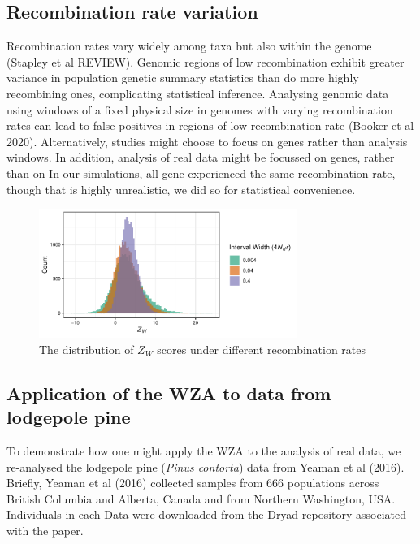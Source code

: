 \documentclass[11pt,twoside,lineno]{GSA_format}
\begin{document}
\subsection{Recombination rate variation}

Recombination rates vary widely among taxa but also within the genome (Stapley et al REVIEW). Genomic regions of low recombination exhibit greater variance in population genetic summary statistics than do more highly recombining ones, complicating statistical inference. Analysing genomic data using windows of a fixed physical size in genomes with varying recombination rates can lead to false positives in regions of low recombination rate (Booker et al 2020). Alternatively, studies might choose to focus on genes rather than analysis windows.
In addition, analysis of real data might be focussed on genes, rather than on 
In our simulations, all gene experienced the same recombination rate, though that is highly unrealistic, we did so for statistical convenience.

\begin{figure}[H]
  \includegraphics[width=0.75\textwidth,height=0.5\textheight,keepaspectratio]{Plots/recombinationRateHistogram.pdf} 
  \caption{The distribution of $Z_W$ scores under different recombination rates }

  \label{fig:WZA_Recombination}
\end{figure}

 
\subsection{Application of the WZA to data from lodgepole pine}

To demonstrate how one might apply the WZA to the analysis of real data, we re-analysed the lodgepole pine (\textit{Pinus contorta}) data from Yeaman et al (2016). Briefly, Yeaman et al (2016) collected samples from 666 populations across British Columbia and Alberta, Canada and from Northern Washington, USA. Individuals in each 
Data were downloaded from the Dryad repository associated with the paper. 
\end{document}
